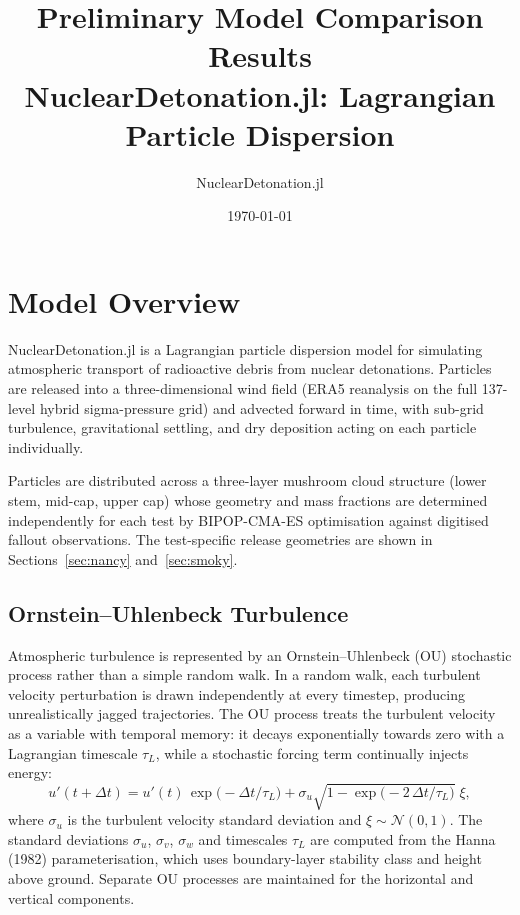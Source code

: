 \documentclass[11pt,a4paper]{article}
\title{Preliminary Model Comparison Results\\[0.5em]
\large NuclearDetonation.jl: Lagrangian Particle Dispersion}
\author{NuclearDetonation.jl}
\date{\today}
\begin{document}
\maketitle

\section{Model Overview}

NuclearDetonation.jl is a Lagrangian particle dispersion model for
simulating atmospheric transport of radioactive debris from nuclear
detonations. Particles are released into a three-dimensional wind field
(ERA5 reanalysis on the full 137-level hybrid sigma-pressure grid) and
advected forward in time, with sub-grid turbulence, gravitational settling,
and dry deposition acting on each particle individually.

Particles are distributed across a three-layer mushroom cloud structure
(lower stem, mid-cap, upper cap) whose geometry and mass fractions are
determined independently for each test by BIPOP-CMA-ES optimisation against
digitised fallout observations. The test-specific release geometries are
shown in Sections~\ref{sec:nancy} and~\ref{sec:smoky}.

\subsection{Ornstein--Uhlenbeck Turbulence}

Atmospheric turbulence is represented by an Ornstein--Uhlenbeck (OU)
stochastic process \cite{uhlenbeck1930} rather than a simple random walk. In a random walk, each
turbulent velocity perturbation is drawn independently at every timestep,
producing unrealistically jagged trajectories. The OU process treats the
turbulent velocity as a variable with temporal memory: it decays
exponentially towards zero with a Lagrangian timescale $\tau_L$, while a
stochastic forcing term continually injects energy:
\begin{equation}
    u'(t + \Delta t) = u'(t)\,\exp\!\bigl(-\Delta t / \tau_L\bigr)
    + \sigma_u \sqrt{1 - \exp\!\bigl(-2\,\Delta t / \tau_L\bigr)}\;\xi,
\end{equation}
where $\sigma_u$ is the turbulent velocity standard deviation and
$\xi \sim \mathcal{N}(0,1)$. The standard deviations $\sigma_u$,
$\sigma_v$, $\sigma_w$ and timescales $\tau_L$ are computed from the Hanna
(1982) parameterisation, which uses boundary-layer stability class and
height above ground. Separate OU processes are maintained for the horizontal
and vertical components.
\end{document}
